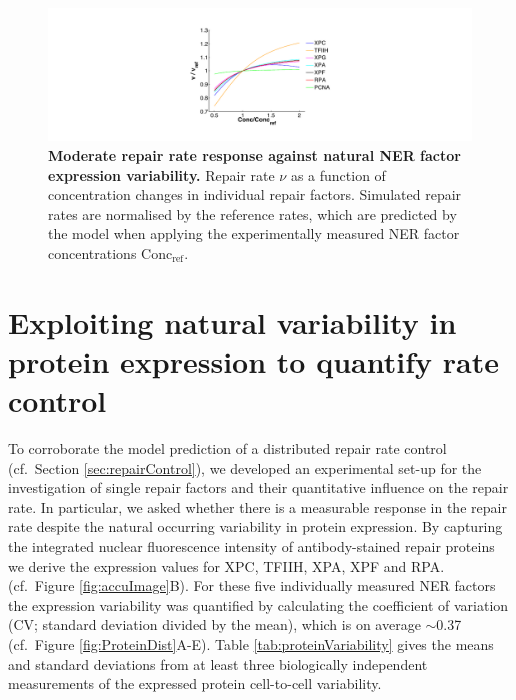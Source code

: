 \begin{figure}[htbp]
	\begin{center}
		\includegraphics[width=1\textwidth]{Abbildungen/figure3_1_b.pdf}
		\caption{\textbf{Moderate repair rate response against natural NER factor expression variability.} Repair rate $\nu$ as a function of concentration changes in individual repair factors. Simulated repair rates are normalised by the reference rates, which are predicted by the model when applying the experimentally measured NER factor concentrations $\text{Conc}_{\text{ref}}$.} 
		\label{fig:R_largeProteinVariation}
	\end{center}
\end{figure}

\section{Exploiting natural variability in protein expression to quantify rate control}
\label{natural_Variability_m}
To corroborate the model prediction of a distributed repair rate control (cf.\ Section \ref{sec:repairControl}), we developed an experimental set-up for the investigation of single repair factors and their quantitative influence on the repair rate. In particular, we asked whether there is a measurable response in the repair rate despite the natural occurring variability in protein expression. By capturing the integrated nuclear fluorescence intensity of antibody-stained repair proteins we derive the expression values for XPC, TFIIH, XPA, XPF and RPA. (cf.\ Figure \ref{fig:accuImage}B). For these five individually measured NER factors the expression variability was quantified by calculating the coefficient of variation (CV; standard deviation divided by the mean), which is on average $\sim$0.37 (cf.\ Figure \ref{fig:ProteinDist}A-E). Table \ref{tab:proteinVariability} gives the means and standard deviations from at least three biologically independent measurements of the expressed protein cell-to-cell variability.

